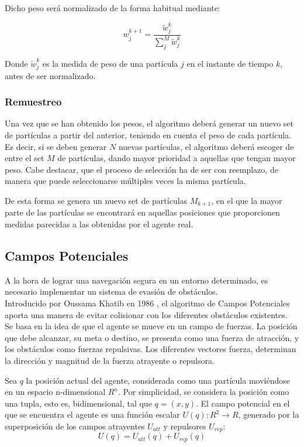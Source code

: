 Dicho peso será normalizado de la forma habitual mediante: 

\begin{equation}
w_j^{k+1}=\frac{\tilde{w}_j^k}{\sum_{j}^M \tilde{w}_j^k}
\end{equation}

Donde $\tilde{w}_j^k$ es la medida de peso de una partícula $j$ en el instante de tiempo $k$, antes de ser normalizado.


\subsubsection{Remuestreo}
Una vez que se han obtenido los pesos, el algoritmo deberá generar un nuevo set de partículas a partir del anterior, teniendo en cuenta el peso de cada partícula. Es decir, si se deben generar $N$ nuevas partículas, el algoritmo deberá escoger de entre el set $M$ de partículas, dando mayor prioridad a aquellas que tengan mayor peso. Cabe destacar, que el proceso de selección ha de ser con reemplazo, de manera que puede seleccionarse múltiples veces la misma partícula. 

De esta forma se genera un nuevo set de partículas $M_{k+1}$, en el que la mayor parte de las partículas se encontrará en aquellas posiciones que proporcionen medidas parecidas a las obtenidas por el agente real.


\subsection{Campos Potenciales}
\label{subsec:PF}
\setcounter{equation}{0}
A la hora de lograr una navegación segura en un entorno determinado, es necesario implementar un sistema de evasión de obstáculos. \\Introducido por Oussama Khatib en 1986 \citep{art:Khatib}, el algoritmo de Campos Potenciales aporta una manera de evitar colisionar con los diferentes obstáculos existentes.\\ Se basa en la idea de que el agente se mueve en un campo de fuerzas. 
La posición que debe alcanzar, su meta o destino, se presenta como una fuerza de atracción, y los obstáculos como fuerzas repulsivas. 
Los diferentes vectores fuerza, determinan la dirección y magnitud de la fuerza atrayente o repulsora.

Sea $q$ la posición actual del agente, considerada como una partícula moviéndose en un espacio n-dimensional $R^n$. Por simplicidad, se considera la posición como una tupla, esto es, bidimensional, tal que $q = (x,y)$. El campo potencial en el que se encuentra el agente es una función escalar $ U(q):R^2\rightarrow R $, generado por la superposición de los campos atrayentes $U_{att}$ y repulsores $U_{rep}$:
\begin{equation}
U(q) = U_{att}(q) + U_{rep}(q)
\label{equation:Uq}
\end{equation}

